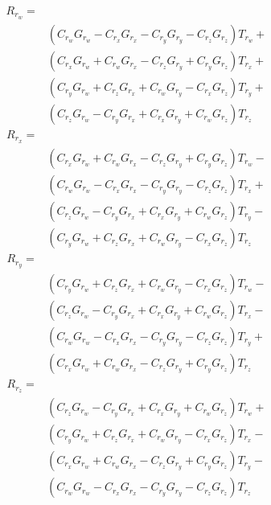 \documentclass[12pt]{article}
\begin{document}
	\begin{equation}
		\begin{split}
			R_{r_w} = \\&
			(C_{r_w} G_{r_w}-C_{r_x} G_{r_x}-C_{r_y} G_{r_y}-C_{r_z} G_{r_z}) T_{r_w}+\\&(C_{r_x} G_{r_w}+C_{r_w} G_{r_x}-C_{r_z} G_{r_y}+C_{r_y} G_{r_z}) T_{r_x}+\\&(C_{r_y} G_{r_w}+C_{r_z} G_{r_x}+C_{r_w} G_{r_y}-C_{r_x} G_{r_z}) T_{r_y}+\\&(C_{r_z} G_{r_w}-C_{r_y} G_{r_x}+C_{r_x} G_{r_y}+C_{r_w} G_{r_z}) T_{r_z}
		\end{split}
		\label{eq:rrw}
	\end{equation}
	\begin{equation}
		\begin{split}
			R_{r_x} = \\&
			(C_{r_x} G_{r_w}+C_{r_w} G_{r_x}-C_{r_z} G_{r_y}+C_{r_y} G_{r_z}) T_{r_w}-\\&(C_{r_w} G_{r_w}-C_{r_x} G_{r_x}-C_{r_y} G_{r_y}-C_{r_z} G_{r_z}) T_{r_x}+\\&(C_{r_z} G_{r_w}-C_{r_y} G_{r_x}+C_{r_x} G_{r_y}+C_{r_w} G_{r_z}) T_{r_y}-\\&(C_{r_y} G_{r_w}+C_{r_z} G_{r_x}+C_{r_w} G_{r_y}-C_{r_x} G_{r_z}) T_{r_z}
		\end{split}
	\end{equation}
	\begin{equation}
		\begin{split}
			R_{r_y} = \\&
			(C_{r_y} G_{r_w}+C_{r_z} G_{r_x}+C_{r_w} G_{r_y}-C_{r_x} G_{r_z}) T_{r_w}-\\&(C_{r_z} G_{r_w}-C_{r_y} G_{r_x}+C_{r_x} G_{r_y}+C_{r_w} G_{r_z}) T_{r_x}-\\&(C_{r_w} G_{r_w}-C_{r_x} G_{r_x}-C_{r_y} G_{r_y}-C_{r_z} G_{r_z}) T_{r_y}+\\&(C_{r_x} G_{r_w}+C_{r_w} G_{r_x}-C_{r_z} G_{r_y}+C_{r_y} G_{r_z}) T_{r_z}
		\end{split}
	\end{equation}
	\begin{equation}
		\begin{split}
			R_{r_z} = \\&
			(C_{r_z} G_{r_w}-C_{r_y} G_{r_x}+C_{r_x} G_{r_y}+C_{r_w} G_{r_z}) T_{r_w}+\\&(C_{r_y} G_{r_w}+C_{r_z} G_{r_x}+C_{r_w} G_{r_y}-C_{r_x} G_{r_z}) T_{r_x}-\\&(C_{r_x} G_{r_w}+C_{r_w} G_{r_x}-C_{r_z} G_{r_y}+C_{r_y} G_{r_z}) T_{r_y}-\\&(C_{r_w} G_{r_w}-C_{r_x} G_{r_x}-C_{r_y} G_{r_y}-C_{r_z} G_{r_z}) T_{r_z}
		\end{split}
	\end{equation}
\end{document}
